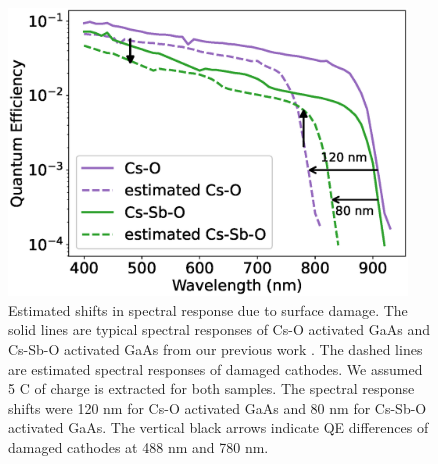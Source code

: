 \begin{figure}
	\centering
	\includegraphics*[width=300pt]{figs/heracles/degrade.eps}
	\caption{Estimated shifts in spectral response due to surface damage. The solid lines are typical spectral responses of Cs-O activated GaAs and Cs-Sb-O activated GaAs from our previous work \cite{cultrera2020_LongLifetimePolarized}. The dashed lines are estimated spectral responses of damaged cathodes. We assumed 5 C of charge is extracted for both samples. The spectral response shifts were 120 nm for Cs-O activated GaAs and 80 nm for Cs-Sb-O activated GaAs. The vertical black arrows indicate QE differences of damaged cathodes at 488 nm and 780 nm.}
	\label{fig_degrade22}
\end{figure}

